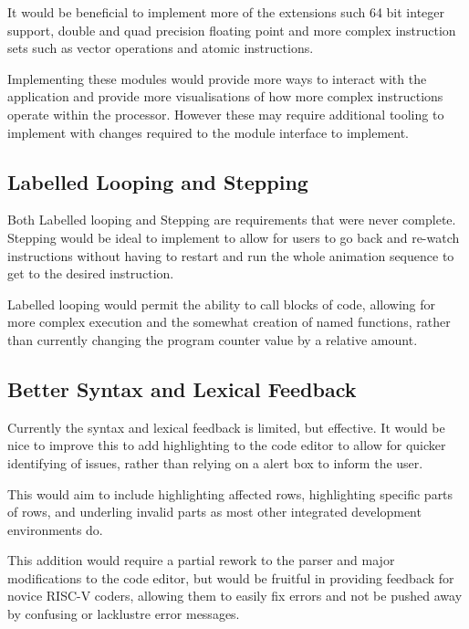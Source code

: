 It would be beneficial to implement more of the extensions such 64 bit integer support, double and quad precision floating point and more complex instruction sets such as vector operations and atomic instructions. 

Implementing these modules would provide more ways to interact with the application and provide more visualisations of how more complex instructions operate within the processor. However these may require additional tooling to implement with changes required to the module interface to implement.

\subsection{Labelled Looping and Stepping}
Both Labelled looping and Stepping are requirements that were never complete. Stepping would be ideal to implement to allow for users to go back and re-watch instructions without having to restart and run the whole animation sequence to get to the desired instruction.

Labelled looping would permit the ability to call blocks of code, allowing for more complex execution and the somewhat creation of named functions, rather than currently changing the program counter value by a relative amount.

\subsection{Better Syntax and Lexical Feedback}
Currently the syntax and lexical feedback is limited, but effective. It would be nice to improve this to add highlighting to the code editor to allow for quicker identifying of issues, rather than relying on a alert box to inform the user.

This would aim to include highlighting affected rows, highlighting specific parts of rows, and underling invalid parts as most other integrated development environments do.

This addition would require a partial rework to the parser and major modifications to the code editor, but would be fruitful in providing feedback for novice RISC-V coders, allowing them to easily fix errors and not be pushed away by confusing or lacklustre error messages.

